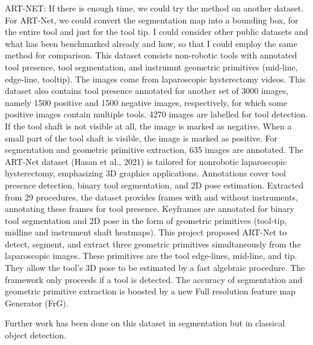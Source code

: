 ART-NET: If there is enough time, we could try the method on another dataset. For ART-Net, we could convert the segmentation map into a bounding box, for the entire tool and just for the tool tip. I could consider other public datasets and what has been benchmarked already and how, so that I could employ the same method for comparison.
This dataset consists non-robotic tools with annotated tool presence, tool segmentation, and instrumnt geometric primitives (mid-line, edge-line, tooltip). The images come from laparoscopic hysterectomy videos. This dataset also contains tool presence annotated for another set of 3000 images, namely 1500 positive and 1500 negative images, respectively, for which some positive images contain multiple tools. 4270 images are labelled for tool detection. If the tool shaft is not visible at all, the image is marked as negative. When a small part of the tool shaft is visible, the image is marked as positive. For segmentation and geometric primitive extraction, 635 images are annotated.
The ART-Net dataset (Hasan et al., 2021) is tailored for nonrobotic laparoscopic hysterectomy, emphasizing 3D graphics applications. Annotations cover tool presence detection, binary tool segmentation, and 2D pose estimation. Extracted from 29 procedures, the dataset provides frames with and without instruments, annotating these frames for tool presence. Keyframes are annotated for binary tool segmentation and 2D pose in the form of geometric primitives (tool-tip, midline and instrument shaft heatmaps). 
This project proposed ART-Net to detect, segment, and extract three geometric primitives simultaneously from the laparoscopic images. These primitives are the tool edge-lines, mid-line, and tip. They allow the tool's 3D pose to be estimated by a fast algebraic procedure. The framework only proceeds if a tool is detected. The accuracy of segmentation and geometric primitive extraction is boosted by a new Full resolution feature map Generator (FrG). 

Further work has been done on this dataset in segmentation \cite{lou_min-max_2022} but in classical object detection.



